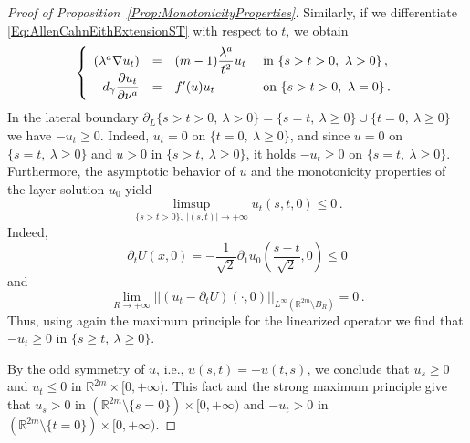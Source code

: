 \documentclass[twoside,leqno,symbols-for-thanks, draft]{rmi}
\numberwithin{equation}{section}
\theoremstyle{definition}
\newcommand{\con}[1]{\mathbb{#1}}
\newcommand{\R}{\con{R}} %
\newcommand{\norm}[1]{\left | \left |{#1} \right | \right |}
\newcommand{\s}{\gamma}
\newcommand{\bpar}[1]{\left ( {#1}\right )}
\newcommand\beqc[1]{\left\{\begin{array}{#1}}
\newcommand\eeqc{\end{array} \right.}
\def\PDEsystem{rcll}
\let\div\relax
\DeclareMathOperator{\div}{div}
\begin{document}
\begin{proof}[Proof of Proposition~\ref{Prop:MonotonicityProperties}]
	Similarly, if we differentiate \eqref{Eq:AllenCahnEithExtensionST} with respect to $t$, we obtain
	$$
	\beqc{\PDEsystem}
	\div (\lambda^a \nabla u_t) &=& (m-1) \dfrac{\lambda^a}{t^2}u_t & \text{ in } \{ s > t > 0 ,\ \lambda > 0\}\,, \\
	d_\s \dfrac{\partial u_t}{\partial \nu^a}& = & f'(u)u_t& \text{ on }  \{ s > t > 0 , \ \lambda = 0\}\,.
	\eeqc
	$$
	In the lateral boundary $\partial_L \{ s > t > 0 ,\ \lambda > 0\} = \{s = t,\ \lambda \geq 0 \}\cup \{t=0, \ \lambda \geq 0\}$ we have  $-u_t \geq 0$. Indeed, $u_t= 0$ on $\{t=0, \ \lambda \geq 0\}$, and since $u = 0$ on $\{s = t,\ \lambda \geq 0 \}$ and $u>0$ in $\{s > t,\ \lambda \geq 0 \}$, it holds $-u_t \geq 0$ on $\{s = t,\ \lambda \geq 0 \}$. Furthermore, the asymptotic behavior of $u$ and the monotonicity properties of the layer solution $u_0$ yield
	$$
	\limsup_{\{s> t>0\} ,\ |(s,t)|\to +\infty}  u_t(s,t,0) \leq 0\,.
	$$
	Indeed, 
	$$
	\partial_t U (x,0) = -\dfrac{1}{\sqrt{2}} \partial_1 u_0\bpar{\dfrac{s-t}{\sqrt{2}}, 0} \leq 0 
	$$
	and 
	$$
	\lim_{R\to +\infty} \norm{(u_t - \partial_t U) (\cdot,0) }_{L^\infty(\R^{2m}\setminus B_{R})} = 0\,.
	$$
	Thus, using again the maximum principle for the linearized operator we find that $-u_t \geq 0$ in $\{ s \geq t,\ \lambda \geq 0\}$.
	
	By the odd symmetry of $u$, i.e., $u(s,t)=-u(t,s)$, we conclude that  $u_s \geq 0$ and $u_t \leq 0$ in $\R^{2m} \times [0, +\infty)$. This fact and the strong maximum principle give that $u_s > 0$ in $(\R^{2m}\setminus \{s=0\}) \times [0, +\infty)$ and $- u_t > 0$ in $(\R^{2m}\setminus \{t=0\}) \times [0, +\infty)$.
	

\end{proof}
\end{document}
